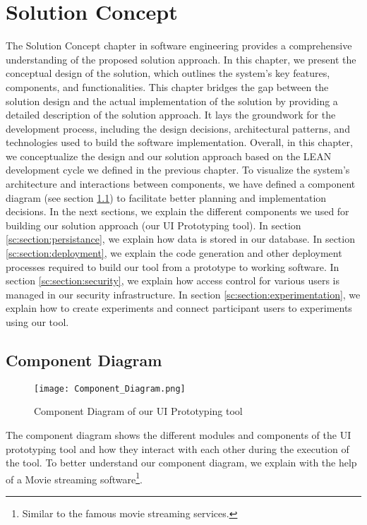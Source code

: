
\chapter{Solution Concept}

\ifpdf
    \graphicspath{{Chapters/Solution-Concept/Figs/}{Chapters/Solution-Concept/Figs/}{Chapters/Solution-Concept/Figs/}}
\else
    \graphicspath{{Chapters/Solution-Concept/Figs/}{Chapters/Solution-Concept/Figs/}}
\fi
The Solution Concept chapter in software engineering provides a comprehensive understanding of the proposed solution approach. 
In this chapter, we present the conceptual design of the solution, which outlines the system's key features, components, and functionalities. 
This chapter bridges the gap between the solution design and the actual implementation of the solution by providing a detailed description of the solution approach. 
It lays the groundwork for the development process, including the design decisions, architectural patterns, and technologies used to build the software implementation. 
Overall, in this chapter, we conceptualize the design and our solution approach based on the LEAN development cycle we defined in the previous chapter.
To visualize the system's architecture and interactions between components, we have defined a component diagram (see section \ref{sc:section:componentD}) to facilitate better planning and implementation decisions.
In the next sections, we explain the different components we used for building our solution approach (our UI Prototyping tool). 
In section \ref{sc:section:persistance}, we explain how data is stored in our database. 
In section \ref{sc:section:deployment}, we explain the code generation and other deployment processes required to build our tool from a prototype to working software.
In section \ref{sc:section:security}, we explain how access control for various users is managed in our security infrastructure. 
In section \ref{sc:section:experimentation}, we explain how to create experiments and connect participant users to experiments using our tool. 

\section{Component Diagram}
\label{sc:section:componentD}
\begin{figure}[htbp!]
    \centering    
    \texttt{[image: Component\_Diagram.png]} 
    \caption[Component Diagram]{Component Diagram of our UI Prototyping tool}
    \label{fig:sc:componentD}
\end{figure}
The component diagram shows the different modules and components of the UI prototyping tool and how they interact with each other during the execution of the tool.
To better understand our component diagram, we explain with the help of a Movie streaming software\footnote{Similar to the famous movie streaming services.}.

